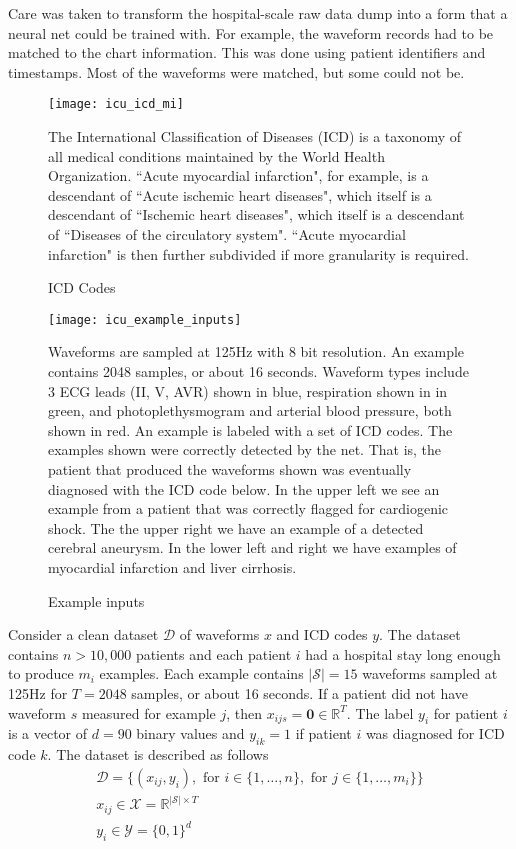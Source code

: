 Care was taken to transform the hospital-scale raw data dump into a form that a neural net could be trained with.  For example, the waveform records had to be matched to the chart information.  This was done using patient identifiers and timestamps.  Most of the waveforms were matched, but some could not be.

\begin{figure}
\texttt{[image: icu\_icd\_mi]}
\caption{ICD Codes}
\vspace{12px}
The International Classification of Diseases (ICD) is a taxonomy of all medical conditions maintained by the World Health Organization.  ``Acute myocardial infarction", for example, is a descendant of ``Acute ischemic heart diseases", which itself is a descendant of ``Ischemic heart diseases", which itself is a descendant of ``Diseases of the circulatory system".  ``Acute myocardial infarction" is then further subdivided if more granularity is required.
\label{fig:icu_icd_mi}
\end{figure}
    
\begin{figure}
\texttt{[image: icu\_example\_inputs]}
\caption{Example inputs}
\vspace{12px}
Waveforms are sampled at 125Hz with 8 bit resolution.  An example contains 2048 samples, or about 16 seconds.  Waveform types include 3 ECG leads (II, V, AVR) shown in blue, respiration shown in in green, and photoplethysmogram and arterial blood pressure, both shown in red.  An example is labeled with a set of ICD codes.  The examples shown were correctly detected by the net.  That is, the patient that produced the waveforms shown was eventually diagnosed with the ICD code below.  In the upper left we see an example from a patient that was correctly flagged for cardiogenic shock.  The the upper right we have an example of a detected cerebral aneurysm.  In the lower left and right we have examples of myocardial infarction and liver cirrhosis.
\label{fig:icu_example_waveforms}
\end{figure}

Consider a clean dataset $\mathcal{D}$ of waveforms $x$ and ICD codes $y$.  The dataset contains $n > 10,000$ patients and each patient $i$ had a hospital stay long enough to produce $m_i$ examples.  Each example contains $|\mathcal{S}|=15$ waveforms sampled at 125Hz for $T = 2048$ samples, or about 16 seconds.  If a patient did not have waveform $s$ measured for example $j$, then $x_{ijs} = \mathbf{0} \in \mathbb{R}^T$.  The label $y_i$ for patient $i$ is a vector of $d=90$ binary values and $y_{ik} = 1$ if patient $i$ was diagnosed for ICD code $k$.  The dataset is described as follows
\begin{gather}
    \mathcal{D} = \{
        (x_{ij}, y_i),
        \text{ for } i \in \{ 1, \dots, n \},
        \text{ for } j \in \{ 1, \dots, m_i \}
    \} \\
    x_{ij} \in \mathcal{X} = \mathbb{R}^{|\mathcal{S}| \times T} \\
    y_i \in \mathcal{Y} = \{0, 1\}^d
\end{gather}

